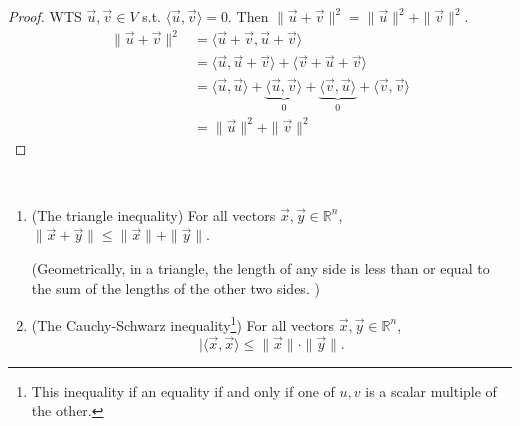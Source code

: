 \documentclass[11pt,fleqn]{book} %
\begin{document}
\begin{proof}
    WTS $\vec{u}, \vec{v} \in V$ s.t. $\langle \vec{u}, \vec{v} \rangle = 0$. Then $\|\vec{u} + \vec{v}\|^2 = \|\vec{u}\|^2 + \|\vec{v}\|^2$. 
    \begin{align*}
        \|\vec{u} + \vec{v}\|^2
        &= \langle \vec{u} + \vec{v}, \vec{u} + \vec{v} \rangle
        \\
        &= \langle \vec{u}, \vec{u} + \vec{v} \rangle + \langle \vec{v} + \vec{u} + \vec{v} \rangle
        \\
        &=
        \langle \vec{u}, \vec{u} \rangle + \underbrace{\langle \vec{u}, \vec{v} \rangle}_{0} + \underbrace{\langle \vec{v}, \vec{u} \rangle}_{0} + \langle \vec{v}, \vec{v} \rangle
        \\
        &= \|\vec{u}\|^2 + \|\vec{v}\|^2
    \end{align*}
\end{proof}

\setcounter{chapter}{4}
\begin{proposition}
{~~~}

    \begin{enumerate}[label=\alph*)]
        \item (The triangle inequality) For all vectors $\vec{x}, \vec{y} \in \mathbb{R}^n$, $\| \vec{x} + \vec{y} \| \le \|\vec{x}\| + \|\vec{y}\|$. 
        
        (Geometrically, in a triangle, the length of any side is less than or equal to the sum of the lengths of the other two sides. )
        \begin{center}
        \end{center}
        
        \item (The Cauchy-Schwarz inequality\footnote{This inequality if an equality if and only if one of $u, v$ is a scalar multiple of the other. }) For all vectors $\vec{x}, \vec{y} \in \mathbb{R}^n$, $$| \langle \vec{x}, \vec{x} \rangle \le \|\vec{x}\| \cdot \|\vec{y}\|. $$
    \end{enumerate}
\end{proposition}
\setcounter{chapter}{3}
\end{document}
